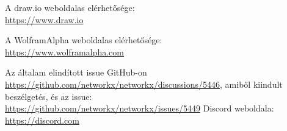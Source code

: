 \documentclass[
]{thesis-ekf}
\theoremstyle{definition}
\theoremstyle{remark}
\begin{document}
\begin{thebibliography}{2}
	A draw.io weboldalas elérhetősége:
	\\\url{https://www.draw.io}
	
	A WolframAlpha weboldalas elérhetősége:
	\\\url{https://www.wolframalpha.com}
	
	Az általam elindított issue GitHub-on
	\\\url{https://github.com/networkx/networkx/discussions/5446}, amiből kiindult beszélgetés, és az issue:
	\\\url{https://github.com/networkx/networkx/issues/5449}		
	Discord weboldala:
	\\\url{https://discord.com}
\end{thebibliography}
	
\end{document}
